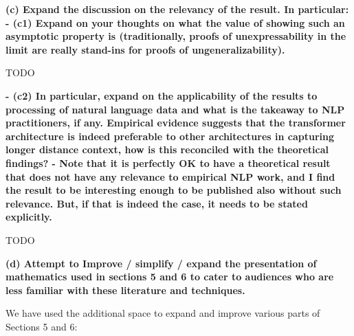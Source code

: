 \documentclass[11pt,a4paper]{article}
\newcommand\response[1]{{\color{blue}#1}}
\newcommand\original[1]{\textbf{#1}}
\begin{document}
\original{(c) Expand the discussion on the relevancy of the result. In particular:
- (c1) Expand on your thoughts on what the value of showing such an
asymptotic property is (traditionally, proofs of unexpressability in the
limit are really stand-ins for proofs of ungeneralizability).}

\response{TODO}

\original{- (c2) In particular, expand on the applicability of the results to
processing of natural language data and what is the takeaway to NLP
practitioners, if any. Empirical evidence suggests that the transformer
architecture is indeed preferable to other architectures in capturing longer
distance context, how is this reconciled with the theoretical findings?
- Note that it is perfectly OK to have a theoretical result that does not
have any relevance to empirical NLP work, and I find the result to be
interesting enough to be published also without such relevance. But, if that
is indeed the case, it needs to be stated explicitly.}

\response{TODO}

\original{(d) Attempt to Improve / simplify / expand the presentation of mathematics
used in sections 5 and 6 to cater to audiences who are less familiar with
these literature and techniques.}

\response{We have used the additional space to expand and improve various parts of Sections 5 and 6:}
\end{document}
